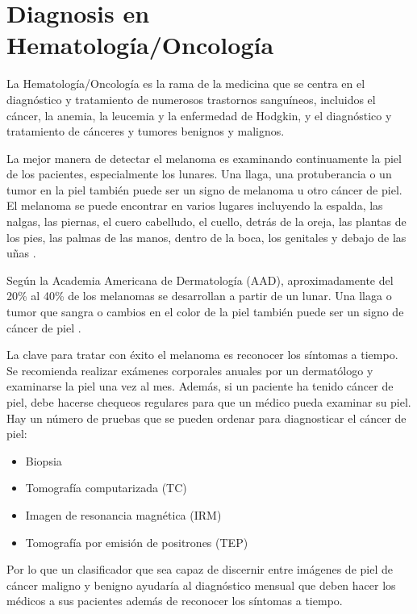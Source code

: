 \chapter{Diagnosis en \\ Hematología/Oncología}
La Hematología/Oncología es la rama de la medicina que se centra en el diagnóstico y tratamiento de numerosos trastornos sanguíneos, incluidos el cáncer, la anemia, la leucemia y la enfermedad de Hodgkin, y el diagnóstico y tratamiento de cánceres y tumores benignos y malignos.

La mejor manera de detectar el melanoma es examinando continuamente la piel de los pacientes, especialmente los lunares. Una llaga, una protuberancia o un tumor en la piel también puede ser un signo de melanoma u otro cáncer de piel. El melanoma se puede encontrar en varios lugares incluyendo la espalda, las nalgas, las piernas, el cuero cabelludo, el cuello, detrás de la oreja, las plantas de los pies, las palmas de las manos, dentro de la boca, los genitales y debajo de las uñas \cite{utmedicalcenter}. 

Según la Academia Americana de Dermatología (AAD), aproximadamente del 20\% al 40\% de los melanomas se desarrollan a partir de un lunar. Una llaga o tumor que sangra o cambios en el color de la piel también puede ser un signo de cáncer de piel \cite{utmedicalcenter}. 


La clave para tratar con éxito el melanoma es reconocer los síntomas a tiempo. Se recomienda realizar exámenes corporales anuales por un dermatólogo y examinarse la piel una vez al mes. Además, si un paciente ha tenido cáncer de piel, debe hacerse chequeos regulares para que un médico pueda examinar su piel.
Hay un número de pruebas que se pueden ordenar para diagnosticar el cáncer de piel: 

\begin{itemize}
\item Biopsia
\item Tomografía computarizada (TC)
\item Imagen de resonancia magnética (IRM)
\item Tomografía por emisión de positrones (TEP)
\end{itemize}

Por lo que un clasificador que sea capaz de discernir entre imágenes de piel de cáncer maligno y benigno ayudaría al diagnóstico mensual que deben hacer los médicos a sus pacientes además de reconocer los síntomas a tiempo.